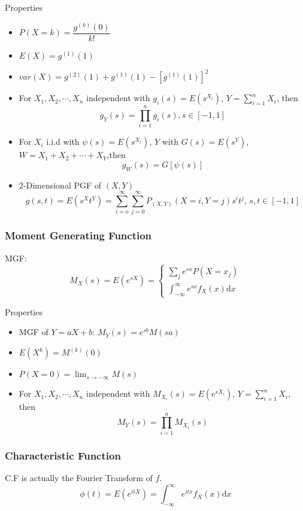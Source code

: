     Properties
    \begin{itemize}
        \item $P(X=k)=\dfrac{g^{(k)}(0)}{k!}$
        \item $E(X)=g^{(1)}(1)$
        \item $var(X)=g^{(2)}(1)+g^{(1)}(1)-[g^{(1)}(1)]^2 $
        \item For $X_1,X_2,\cdots,X_n$ independent with $g_i(s)=E(s^{X_i})$, $Y={\displaystyle \sum_{i=1}^n} X_i$, then
        \[
            g_Y(s)=\prod_{i=1}^n g_i(s),s\in[-1,1]
        \]
        \item For ${X_i}$ i.i.d with $\psi(s)=E(s^{X_i})$, $Y$ with $G(s)=E(s^{Y})$, $W=X_1+X_2+\cdots +X_Y$,then
        \[
            g_W(s)=G[\psi(s)]    
        \]
        \item 2-Dimensional PGF of $(X,Y)$
        \[
            g(s,t)=E(s^Xt^Y)=\sum_{i=o}^\infty\sum_{j=0}^\infty P_{(X,Y)}(X=i,Y=j)s^it^j,\, s,t\in[-1,1]
        \]
    \end{itemize}
\subsubsection{Moment Generating Function}
    MGF: 
    \[
        M_X(s)=E(e^{sX})=\begin{cases}
            \sum_je^{sx}P(X=x_j)\\
            \int_{-\infty}^\infty e^{sx}f_X(x)\mathrm{d}x
        \end{cases}
    \]

    Properties
    \begin{itemize}
        \item MGF of $Y=aX+b$: $
            M_Y(s)=e^{sb}M(sa)    $
        \item $E(X^k)=M^{(k)}(0)$
        \item $P(X=0)={\displaystyle\lim_{s\to -\infty}}M(s)$
        \item For $X_1,X_2,\cdots,X_n$ independent with $M_{X_i}(s)=E(e^{sX_i})$, $Y={\displaystyle \sum_{i=1}^n} X_i$, then
        \[
            M_Y(s)=\prod_{i=1}^n M_{X_i}(s)
        \]
    \end{itemize}
\subsubsection{Characteristic Function}
    C.F is actually the Fourier Transform of $f$.
    \[
        \phi(t)=E(e^{itX}) = \int_{-\infty}^\infty e^{itx}f_X(x)\mathrm{d}x
    \]

